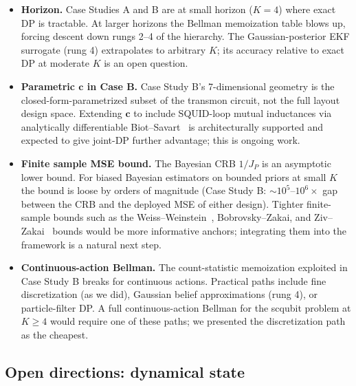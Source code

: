 \documentclass[11pt,a4paper,onecolumn]{article}
\newcommand{\bc}{\bm{c}}
\begin{document}
\begin{itemize}[nosep]
\item \textbf{Horizon.}  Case Studies A and B are at small horizon ($K = 4$) where exact DP is tractable.  At larger horizons the Bellman memoization table blows up, forcing descent down rungs 2--4 of the hierarchy.  The Gaussian-posterior EKF surrogate (rung 4) extrapolates to arbitrary $K$; its accuracy relative to exact DP at moderate $K$ is an open question.
\item \textbf{Parametric $\bc$ in Case B.}  Case Study B's 7-dimensional geometry is the closed-form-parametrized subset of the transmon circuit, not the full layout design space.  Extending $\bc$ to include SQUID-loop mutual inductances via analytically differentiable Biot--Savart~\cite{martinis2014squid} is architecturally supported and expected to give joint-DP further advantage; this is ongoing work.
\item \textbf{Finite sample MSE bound.}  The Bayesian CRB $1/J_P$ is an asymptotic lower bound.  For biased Bayesian estimators on bounded priors at small $K$ the bound is loose by orders of magnitude (Case Study B: $\sim 10^{5}$--$10^{6}\times$ gap between the CRB and the deployed MSE of either design).  Tighter finite-sample bounds such as the Weiss--Weinstein~\cite{weiss1988lower}, Bobrovsky--Zakai, and Ziv--Zakai~\cite{tsang2017ziv} bounds would be more informative anchors; integrating them into the framework is a natural next step.
\item \textbf{Continuous-action Bellman.}  The count-statistic memoization exploited in Case Study B breaks for continuous actions.  Practical paths include fine discretization (as we did), Gaussian belief approximations (rung 4), or particle-filter DP.  A full continuous-action Bellman for the scqubit problem at $K \ge 4$ would require one of these paths; we presented the discretization path as the cheapest.
\end{itemize}

\subsection{Open directions: dynamical state}
\end{document}
